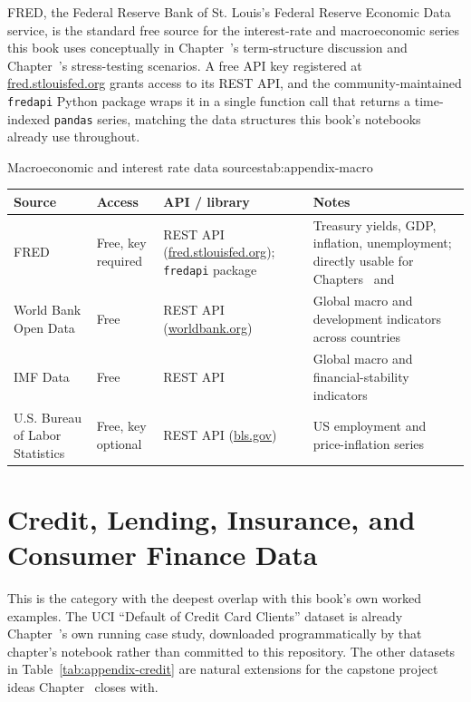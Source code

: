 \documentclass[../ai_in_finance]{subfiles}
\begin{document}
FRED, the Federal Reserve Bank of St. Louis's Federal Reserve Economic Data service, is the standard free source for the interest-rate and macroeconomic series this book uses conceptually in Chapter~'s term-structure discussion and Chapter~'s stress-testing scenarios. A free API key registered at \url{fred.stlouisfed.org} grants access to its REST API, and the community-maintained \texttt{fredapi} Python package wraps it in a single function call that returns a time-indexed \texttt{pandas} series, matching the data structures this book's notebooks already use throughout.

\begin{booktable}[htbp]{Macroeconomic and interest rate data sources}{tab:appendix-macro}
\begin{tabular}{L{3.0cm}L{2.2cm}L{3.6cm}L{4.0cm}}
\toprule
Source & Access & API / library & Notes \\
\midrule
FRED & Free, key required & REST API (\url{fred.stlouisfed.org}); \texttt{fredapi} package & Treasury yields, GDP, inflation, unemployment; directly usable for Chapters~ and~ \\
World Bank Open Data & Free & REST API (\url{worldbank.org}) & Global macro and development indicators across countries \\
IMF Data & Free & REST API & Global macro and financial-stability indicators \\
U.S. Bureau of Labor Statistics & Free, key optional & REST API (\url{bls.gov}) & US employment and price-inflation series \\
\bottomrule
\end{tabular}
\end{booktable}

\section{Credit, Lending, Insurance, and Consumer Finance Data}
\label{sec:appendix-credit-data}

This is the category with the deepest overlap with this book's own worked examples. The UCI ``Default of Credit Card Clients'' dataset is already Chapter~'s own running case study, downloaded programmatically by that chapter's notebook rather than committed to this repository. The other datasets in Table~\ref{tab:appendix-credit} are natural extensions for the capstone project ideas Chapter~ closes with.
\end{document}
